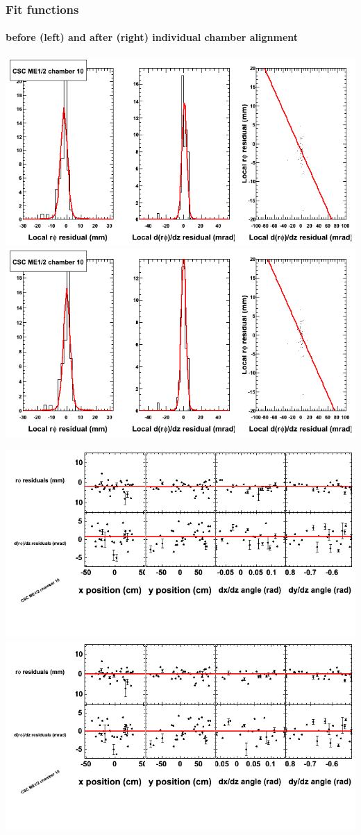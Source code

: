 \documentclass[compress]{beamer}
\begin{document}
\begin{frame}
\frametitle{Fit functions}
\framesubtitle{before (left) and after (right) individual chamber alignment}
\includegraphics[width=0.5\linewidth]{ringfits_3dof/beforefit_MEp12_10_bellcurve.png} \includegraphics[width=0.5\linewidth]{ringfits_3dof/afterfit_MEp12_10_bellcurve.png}

\includegraphics[width=0.5\linewidth]{ringfits_3dof/beforefit_MEp12_10_polynomials.png} \includegraphics[width=0.5\linewidth]{ringfits_3dof/afterfit_MEp12_10_polynomials.png}
\end{frame}
\end{document}

